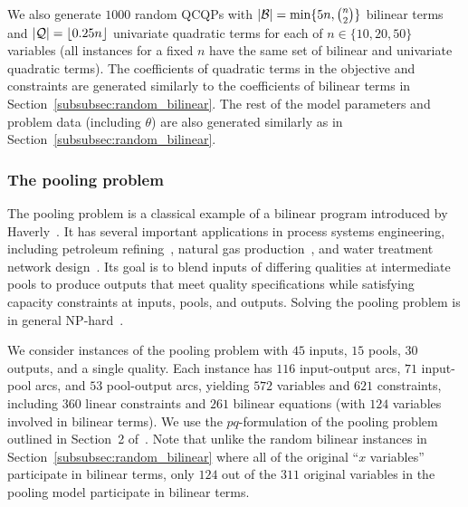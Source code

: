 \documentclass{article}
\DeclarePairedDelimiter\abs{\lvert}{\rvert}%
\begin{document}
We also generate $1000$ random QCQPs with $\abs{\mathcal{B}} = \min\{5n, \binom{n}{2}\}$ bilinear terms and $\abs{\mathcal{Q}} = \lfloor0.25n\rfloor$ univariate quadratic terms for each of $n \in \{10,20,50\}$ variables (all instances for a fixed $n$ have the same set of bilinear and univariate quadratic terms).
The coefficients of quadratic terms in the objective and constraints are generated similarly to the coefficients of bilinear terms in Section~\ref{subsubsec:random_bilinear}.
The rest of the model parameters and problem data (including $\theta$) are also generated similarly as in Section~\ref{subsubsec:random_bilinear}.







\subsubsection{The pooling problem}
\label{subsubsec:pooling_problem}


The pooling problem is a classical example of a bilinear program introduced by Haverly~\cite{haverly1978studies}.
It has several important applications in process systems engineering, including petroleum refining~\cite{kannan2018algorithms,yang2016integrated}, natural gas production~\cite{kannan2018algorithms,li2011stochastic}, and water treatment network design~\cite{bergamini2008improved,misener2013glomiqo,saif2008global}.
Its goal is to blend inputs of differing qualities at intermediate pools to produce outputs that meet quality specifications while satisfying capacity constraints at inputs, pools, and outputs.
Solving the pooling problem is in general NP-hard~\cite{alfaki2013multi}.


We consider instances of the pooling problem with $45$ inputs, $15$ pools, $30$ outputs, and a single quality.
Each instance has $116$ input-output arcs, $71$ input-pool arcs, and $53$ pool-output arcs, yielding $572$ variables and $621$ constraints, including $360$ linear constraints and $261$ bilinear equations (with $124$ variables involved in bilinear terms).
We use the $pq$-formulation of the pooling problem outlined in Section~2 of~\cite{luedtke2020strong}.
Note that unlike the random bilinear instances in Section~\ref{subsubsec:random_bilinear} where all of the original ``$x$ variables'' participate in bilinear terms, only $124$ out of the $311$ original variables in the pooling model participate in bilinear terms.
\end{document}
